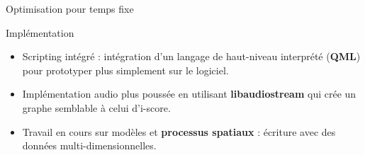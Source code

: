 \begin{block}{Optimisation pour temps fixe}
\end{block}
\begin{block}{Implémentation}
    \begin{itemize}
        \item Scripting intégré : intégration d'un langage de haut-niveau interprété (\textbf{QML}) pour prototyper plus simplement sur le logiciel.
        \item Implémentation audio plus poussée en utilisant \textbf{libaudiostream}\cite{letz_specification_2014} qui crée un graphe semblable à celui d'i-score.
        \item Travail en cours sur modèles et \textbf{processus spatiaux} : écriture avec des données multi-dimensionnelles.
    \end{itemize}
\end{block}
